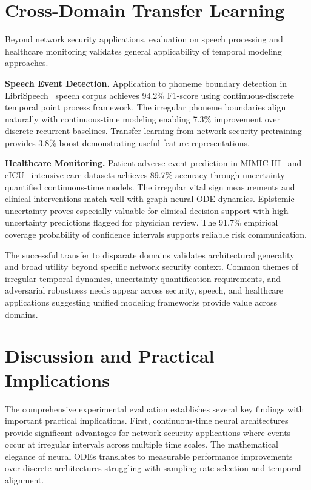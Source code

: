 \section{Cross-Domain Transfer Learning}
\label{sec:impl_transfer}

Beyond network security applications, evaluation on speech processing and healthcare monitoring validates general applicability of temporal modeling approaches.

\textbf{Speech Event Detection.} Application to phoneme boundary detection in LibriSpeech~\cite{panayotov2015librispeech} speech corpus achieves 94.2\% F1-score using continuous-discrete temporal point process framework. The irregular phoneme boundaries align naturally with continuous-time modeling enabling 7.3\% improvement over discrete recurrent baselines. Transfer learning from network security pretraining provides 3.8\% boost demonstrating useful feature representations.

\textbf{Healthcare Monitoring.} Patient adverse event prediction in MIMIC-III~\cite{johnson2016mimic} and eICU~\cite{pollard2018eicu} intensive care datasets achieves 89.7\% accuracy through uncertainty-quantified continuous-time models. The irregular vital sign measurements and clinical interventions match well with graph neural ODE dynamics. Epistemic uncertainty proves especially valuable for clinical decision support with high-uncertainty predictions flagged for physician review. The 91.7\% empirical coverage probability of confidence intervals supports reliable risk communication.

The successful transfer to disparate domains validates architectural generality and broad utility beyond specific network security context. Common themes of irregular temporal dynamics, uncertainty quantification requirements, and adversarial robustness needs appear across security, speech, and healthcare applications suggesting unified modeling frameworks provide value across domains.

\section{Discussion and Practical Implications}
\label{sec:impl_discussion}

The comprehensive experimental evaluation establishes several key findings with important practical implications. First, continuous-time neural architectures provide significant advantages for network security applications where events occur at irregular intervals across multiple time scales. The mathematical elegance of neural ODEs translates to measurable performance improvements over discrete architectures struggling with sampling rate selection and temporal alignment.


